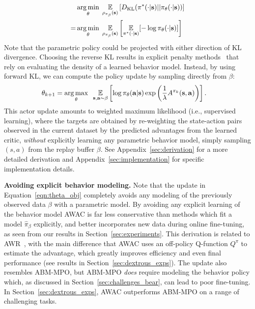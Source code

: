 \documentclass[conference]{IEEEtran}
\begin{document}
\begin{align}
    & \operatorname*{arg\,min}_\theta \; \operatorname*{\mathbb{E}}_{\rho_{\pi_\beta}(\mathbf{s}) } \left[D_{\mathrm{KL}}(\pi^*(\cdot|\mathbf{s})||\pi_\theta(\cdot|\mathbf{s}))\right] \\ =
    & \operatorname*{arg\,min}_\theta \; \operatorname*{\mathbb{E}}_{\rho_{\pi_\beta}(\mathbf{s})} \left[\operatorname*{\mathbb{E}}_{\pi^*(\cdot|\mathbf{s})}[-\log \pi_\theta(\cdot|\mathbf{s})]\right]
\end{align}
Note that the parametric policy could be projected with either direction of KL divergence. Choosing the reverse KL results in explicit penalty methods~\citep{wu2019brac} that rely on evaluating the density of a learned behavior model. 
Instead, by using forward KL, we can compute the policy update by sampling directly from $\beta$:
\begin{align}
    \theta_{k+1} = \argmax_\theta \; & \; \Ex_{\st, \at \sim \buffer}
    \left[\log \pi_\theta(\at|\st) \exp \left(\frac{1}{\lagrangeawr}A^{\pi_k}(\st, \at) \right)\right]. \label{eqn:theta_obj}
\end{align}
This actor update amounts to weighted maximum likelihood (i.e., supervised learning), where the targets are obtained by re-weighting the state-action pairs observed in the current dataset by the predicted advantages from the learned critic, \emph{without} explicitly learning any parametric behavior model, simply sampling $(s, a)$ from the replay buffer $\beta$. See Appendix~\ref{sec:derivation} for a more detailed derivation and Appendix~\ref{sec:implementation} for specific implementation details.

\noindent \textbf{Avoiding explicit behavior modeling.} Note that the update in Equation~\ref{eqn:theta_obj} completely avoids any modeling of the previously observed data $\beta$ with a parametric model. By avoiding any explicit learning of the behavior model AWAC is far less conservative than methods which fit a model $\hat{\pi}_\beta$ explicitly, and better incorporates new data during online fine-tuning, as seen from our results in Section~\ref{sec:experiments}. This derivation is related to AWR~\citep{peng2019awr}, with the main difference that AWAC uses an off-policy Q-function $Q^\pi$ to estimate the advantage, which greatly improves efficiency and even final performance (see results in Section~\ref{sec:dextrous_exps}). The update also resembles ABM-MPO, but ABM-MPO \emph{does} require modeling the behavior policy which, as discussed in Section~\ref{sec:challenges_bear}, can lead to poor fine-tuning. In Section~\ref{sec:dextrous_exps}, AWAC outperforms ABM-MPO on a range of challenging tasks.
\end{document}
